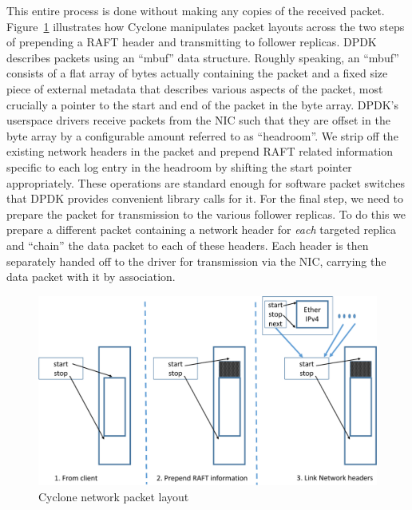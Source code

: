 \documentclass[pageno]{jpaper}
\begin{document}
This entire process is done without making any copies of the received packet.
Figure~\ref{fig:packet_layout} illustrates how
Cyclone manipulates packet layouts across the two steps of prepending a RAFT
header and transmitting to follower replicas. DPDK describes packets using an
``mbuf'' data structure. Roughly speaking, an ``mbuf'' consists of a flat array
of bytes actually containing the packet and a fixed size piece of external
metadata that describes various aspects of the packet, most crucially a pointer
to the start and end of the packet in the byte array. DPDK's userspace drivers
receive packets from the NIC such that they are offset in the byte array by a
configurable amount referred to as ``headroom''. We strip off the existing
network headers in the packet and prepend RAFT related information specific to
each log entry in the headroom by shifting the start pointer appropriately.
These operations are standard enough for software packet switches that DPDK
provides convenient library calls for it. For the final step, we need to prepare
the packet for transmission to the various follower replicas. To do this we
prepare a different packet containing a network header for \emph{each}
targeted replica and ``chain'' the data packet to each of these headers. Each
header is then separately handed off to the driver for transmission via the NIC,
carrying the data packet with it by association.

\begin{figure}
  \centering
  \includegraphics[scale=0.35]{figures2/network_packet.pdf}
  \caption{Cyclone network packet layout}
  \label{fig:packet_layout}
\end{figure}
\end{document}
